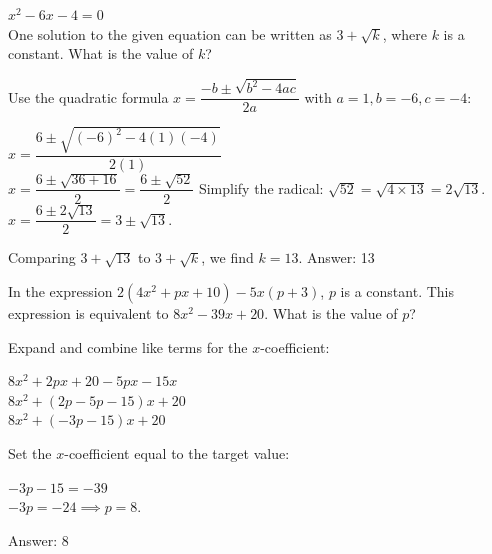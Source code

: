\documentclass[11pt,paper=a4,answers]{exam}
\begin{document}
\begin{questions}
\vspace{1cm}

\question
$x^2 - 6x - 4 = 0$ \\
One solution to the given equation can be written as $3 + \sqrt{k}$, where $k$ is a constant. What is the value of $k$?
\begin{center}
\end{center}

\begin{solution}
Use the quadratic formula $x = \dfrac{-b \pm \sqrt{b^2 - 4ac}}{2a}$ with $a=1, b=-6, c=-4$:
\vspace{5pt}
\begin{center}
$x = \dfrac{6 \pm \sqrt{(-6)^2 - 4(1)(-4)}}{2(1)}$ \\
$x = \dfrac{6 \pm \sqrt{36 + 16}}{2} = \dfrac{6 \pm \sqrt{52}}{2}$
\vspace{5pt}
Simplify the radical: $\sqrt{52} = \sqrt{4 \times 13} = 2\sqrt{13}$. \\
$x = \dfrac{6 \pm 2\sqrt{13}}{2} = 3 \pm \sqrt{13}$.
\end{center}
\vspace{5pt}
Comparing $3 + \sqrt{13}$ to $3 + \sqrt{k}$, we find $k = 13$.
\vspace{5pt}
Answer: \colorbox{yellow!100}{13}
\end{solution}

\vspace{1cm}

\question
In the expression $2(4x^2 + px + 10) - 5x(p + 3)$, $p$ is a constant. This expression is equivalent to $8x^2 - 39x + 20$. What is the value of $p$?

\begin{solution}
Expand and combine like terms for the $x$-coefficient:
\vspace{5pt}
\begin{center}
$8x^2 + 2px + 20 - 5px - 15x$ \\
$8x^2 + (2p - 5p - 15)x + 20$ \\
$8x^2 + (-3p - 15)x + 20$
\end{center}
\vspace{5pt}
Set the $x$-coefficient equal to the target value:
\vspace{5pt}
\begin{center}
$-3p - 15 = -39$ \\
$-3p = -24 \implies p = 8$.
\end{center}
\vspace{5pt}
Answer: \colorbox{yellow!100}{8}
\end{solution}


\end{questions}
\end{document}

